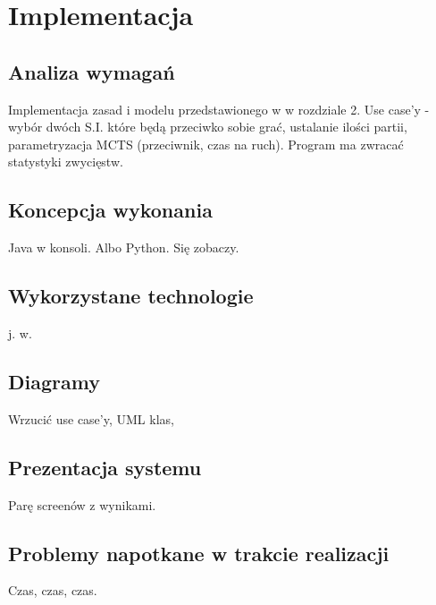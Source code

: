 \chapter{Implementacja}
\label{cha:rozdz4}

\section{Analiza wymagań}
Implementacja zasad i modelu przedstawionego w w rozdziale 2. Use case'y - wybór dwóch S.I. które będą przeciwko sobie grać, ustalanie ilości partii, parametryzacja MCTS (przeciwnik, czas na ruch). Program ma zwracać statystyki zwycięstw.
\section{Koncepcja wykonania}
Java w konsoli. Albo Python. Się zobaczy.

\section{Wykorzystane technologie}
j. w.

\section{Diagramy}
Wrzucić use case'y, UML klas,

\section{Prezentacja systemu}
Parę screenów z wynikami.

\section{Problemy napotkane w trakcie realizacji}
Czas, czas, czas.